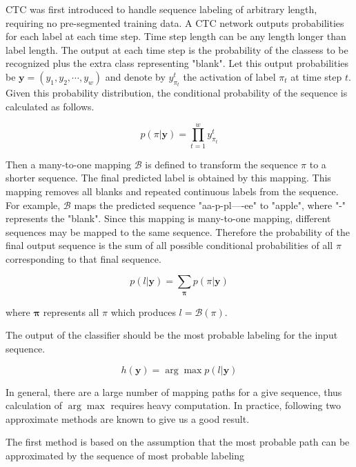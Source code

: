 CTC was first introduced to handle sequence labeling of arbitrary length,
requiring no pre-segmented training data. A CTC network outputs probabilities for each label
at each time step. Time step length can be any length longer than label length.
The output at each time step is the probability of the classess to be recognized plus
the extra class representing "blank". Let this output probabilities be
$\mathbf{y}=(y_1, y_2, \cdots, y_w)$ and denote by $y_{\pi_t}^{t}$ the activation of
label $\pi_t$ at time step $t$. Given this probability distribution, the conditional
probability of the sequence is calculated as follows.

\begin{equation}
    p(\pi |\mathbf{y}) = \prod_{t=1}^{w}y_{\pi_t}^{t}
\end{equation}

Then a many-to-one mapping $\mathcal{B}$ is defined to transform the sequence
$\pi$ to a shorter sequence. The final predicted label is obtained by this mapping.
This mapping removes all blanks and repeated continuous labels from the sequence.
For example, $\mathcal{B}$ maps the predicted sequence "aa-p-pl----ee" to "apple",
where "-" represents the "blank". Since this mapping is many-to-one mapping, different
sequences may be mapped to the same sequence. Therefore the probability of the final
output sequence is the sum of all possible conditional probabilities of all $\pi$ corresponding
to that final sequence.

\begin{equation}
    p(l|\mathbf{y}) = \sum_{\mathbf{\pi}} p(\pi | \mathbf{y})
\end{equation}

where $\mathbf{\pi}$ represents all $\pi$ which produces $l = \mathcal{B}(\pi)$.

The output of the classifier should be the most probable labeling for the input sequence.

\begin{equation}
    h(\mathbf{y}) = \arg\max p(l|\mathbf{y})
\end{equation}

In general, there are a large number of mapping paths for a give sequence, thus
calculation of $\arg\max$ requires heavy computation. In practice, following two approximate
methods are known to give us a good result.

The first method is based on the assumption that the most probable path can be approximated
by the sequence of most probable labeling

